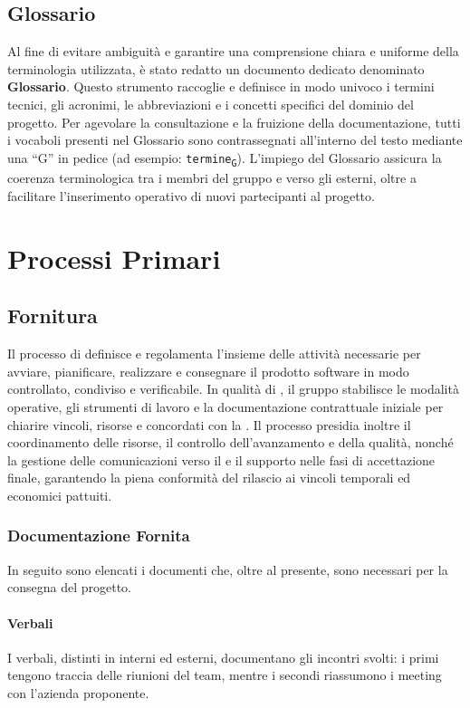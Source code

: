 \documentclass[documento]{gpt}
\newcommand{\subsubsubsection}[1]{\paragraph{#1}}
\begin{document}
	\subsection{Glossario}
	Al fine di evitare ambiguità e garantire una comprensione chiara e uniforme della terminologia utilizzata, è stato redatto un documento dedicato denominato \textbf{Glossario}. Questo strumento raccoglie e definisce in modo univoco i termini tecnici, gli acronimi, le abbreviazioni e i concetti specifici del dominio del progetto.   Per agevolare la consultazione e la fruizione della documentazione, tutti i vocaboli presenti nel Glossario sono contrassegnati all'interno del testo mediante una ``G'' in pedice (ad esempio: \texttt{termine\textsubscript{G}}). L'impiego del Glossario assicura la coerenza terminologica tra i membri del gruppo e verso gli  esterni, oltre a facilitare l'inserimento operativo di nuovi partecipanti al progetto.  
	
	\section{Processi Primari}
	
	\subsection{Fornitura}
	Il processo di  definisce e regolamenta l'insieme delle attività necessarie per avviare, pianificare, realizzare e consegnare il prodotto software in modo controllato, condiviso e verificabile. In qualità di , il gruppo stabilisce le modalità operative, gli strumenti di lavoro e la documentazione contrattuale iniziale per chiarire vincoli, risorse e  concordati con la . Il processo presidia inoltre il coordinamento delle risorse, il controllo dell'avanzamento e della qualità, nonché la gestione delle comunicazioni verso il  e il supporto nelle fasi di accettazione finale, garantendo la piena conformità del rilascio ai vincoli temporali ed economici pattuiti.
	
	\subsubsection{Documentazione Fornita}
	In seguito sono elencati i documenti che, oltre al presente, sono necessari per la consegna del progetto.
	
	\subsubsubsection{Verbali}
	I verbali, distinti in interni ed esterni, documentano gli incontri svolti: i primi tengono traccia delle riunioni del team, mentre i secondi riassumono i meeting con l'azienda proponente.
	
\end{document}
